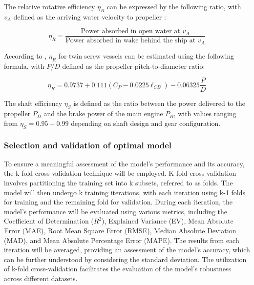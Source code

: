\documentclass[]{interact}
\theoremstyle{plain}%
\theoremstyle{definition}
\theoremstyle{remark}
\begin{document}
The relative rotative efficiency \begin{math} \eta_R \end{math} can be expressed by the following ratio, with $v_A$ defined as the arriving water velocity to propeller \citep{Diesel.2011}:

\begin{equation}
    \label{eqn: n_rot_MAN}
    \eta_R = \frac{\text{Power absorbed in open water at }v_A}{\text{Power absorbed in wake behind the ship at }v_A}
\end{equation}

According to \citet{Holtrop.1982}, $\eta_R$ for twin screw vessels can be estimated using the following formula, with $P/D$ defined as the propeller pitch-to-diameter ratio:

\begin{equation}
    \label{eqn: eta_rot_holtrop}
    \eta_R = 0.9737 + 0.111(C_P-0.0225\ell_{CB}) - 0.06325\frac{P}{D}
\end{equation}

The shaft efficiency \begin{math}\eta_S\end{math} is defined as the ratio between the power delivered to the propeller $P_D$ and the brake power of the main engine $P_B$, with values ranging from $\eta_S = 0.95 - 0.99$ depending on shaft design and gear configuration.


\subsubsection{Selection and validation of optimal model}\label{sec:select_and_val_model}

To ensure a meaningful assessment of the model's performance and its accuracy, the k-fold cross-validation technique will be employed. K-fold cross-validation involves partitioning the training set into k subsets, referred to as folds. The model will then undergo k training iterations, with each iteration using k-1 folds for training and the remaining fold for validation. During each iteration, the model's performance will be evaluated using various metrics, including the Coefficient of Determination ($R^2$), Explained Variance (EV), Mean Absolute Error (MAE), Root Mean Square Error (RMSE), Median Absolute Deviation (MAD), and Mean Absolute Percentage Error (MAPE). The results from each iteration will be averaged, providing an assessment of the model's accuracy, which can be further understood by considering the standard deviation. The utilization of k-fold cross-validation facilitates the evaluation of the model's robustness across different datasets.
\end{document}
